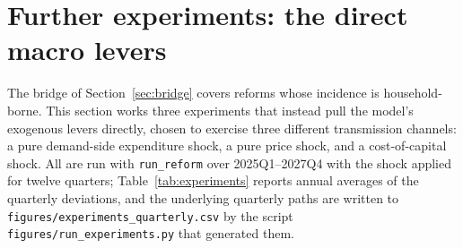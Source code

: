 \section{Further experiments: the direct macro levers}
\label{sec:experiments}

The bridge of Section~\ref{sec:bridge} covers reforms whose incidence is household-borne. This section works three experiments that instead pull the model's exogenous levers directly, chosen to exercise three different transmission channels: a pure demand-side expenditure shock, a pure price shock, and a cost-of-capital shock. All are run with \texttt{run\_reform} over 2025Q1--2027Q4 with the shock applied for twelve quarters; Table~\ref{tab:experiments} reports annual averages of the quarterly deviations, and the underlying quarterly paths are written to \texttt{figures/experiments\_quarterly.csv} by the script \texttt{figures/run\_experiments.py} that generated them.

